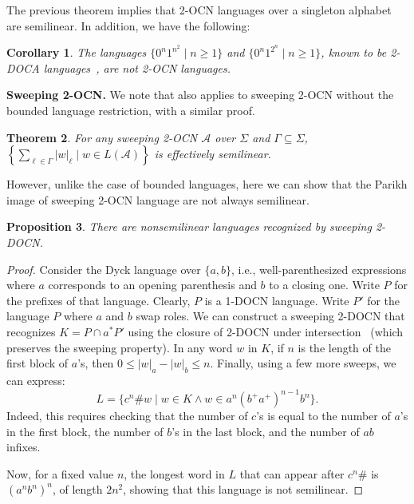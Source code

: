 \documentclass[11pt,a4paper]{amsart}
\newtheorem{theorem}{Theorem}
\newtheorem{corollary}[theorem]{Corollary}
\newtheorem{proposition}[theorem]{Proposition}
\theoremstyle{definition}
\newcommand{\shtodo}[1]{\todo[color=cyan!25,size=\small]{SH: #1}}
\newcommand{\cA}{\mathcal{A}}
\newcommand{\mysubparagraph}[1]{\noindent \textbf{\textsf{#1}} }
\begin{document}
The previous theorem implies that 2-OCN languages over a singleton alphabet are
semilinear. In addition, we have the following:
\begin{corollary}
	\label{cor:2DOCA_not_2OCN}
	The languages \(\{0^n 1^{n^2} \mid n \geq 1\}\) and \(\{0^n1^{2^n} \mid n \geq 1 \}\), known
	to be 2-DOCA languages~\cite{petersen1994two}, are not 2-OCN languages.
\end{corollary}

\mysubparagraph{Sweeping 2-OCN.} 
We note that  also applies to sweeping 2-OCN without the bounded language restriction, with a similar proof. 
\begin{theorem}
	\label{thm:singleton_alphabet_semilinear_sweeping} For any sweeping 2-OCN $\cA$ over $\Sigma$ and \(\Gamma \subseteq \Sigma\), $\left\{ \sum_{\ell \in \Gamma}
	|w|_\ell \mid w \in L(\cA)\right\}$ is effectively semilinear.
\end{theorem}
However, unlike the case of bounded languages, here we can show that the Parikh image of sweeping 2-OCN language are not always semilinear.
\begin{proposition}
	\label{prop:non_semilinear_sweeping}
	There are nonsemilinear languages recognized by sweeping 2-DOCN.
\end{proposition}
\begin{proof}
	Consider the Dyck language over \(\{a, b\}\), i.e., well-parenthesized
	expressions where \(a\) corresponds to an opening parenthesis and \(b\) to a
	closing one.  Write \(P\) for the prefixes of that language.  Clearly, \(P\) is a
	1-DOCN language.  Write \(P'\) for the language \(P\) where \(a\) and \(b\) swap
	roles.  We can construct a sweeping 2-DOCN that recognizes \(K = P \cap a^*P'\)
	using the closure of 2-DOCN under intersection~\cite{miyano1982two} (which preserves the sweeping property).  
	In any word \(w\) in \(K\), if \(n\) is the length of the first block of
	\(a\)'s, then \(0 \leq |w|_a - |w|_b \leq n\).  Finally, using a few more sweeps, we can
	express:
	\[
	L = \{c^n \# w \mid w \in K \land w \in a^n(b^+a^+)^{n-1}b^n \}.
	\]
	Indeed, this requires checking that the number of $c$'s is equal to the number
	of $a$'s in the first block, the number of $b$'s in the last block, and the
	number of $ab$ infixes.
	
	Now, for a fixed value \(n\), the longest word in \(L\) that can appear after \(c^n\#\) is
	\((a^nb^n)^n\), of length \(2n^2\), showing that this language is not semilinear.
\end{proof}
\end{document}
